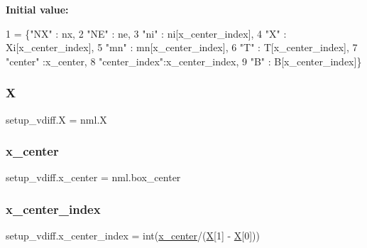 {\bfseries Initial value\+:}
\begin{DoxyCode}
1 =  \{\textcolor{stringliteral}{"NX"}       : nx,
2              \textcolor{stringliteral}{"NE"}       : ne,
3              \textcolor{stringliteral}{"ni"}       : ni[x\_center\_index],
4              \textcolor{stringliteral}{"X"}        : Xi[x\_center\_index],
5              \textcolor{stringliteral}{"mn"}       : mn[x\_center\_index],
6              \textcolor{stringliteral}{"T"}        : T[x\_center\_index],
7              \textcolor{stringliteral}{"center"}   :x\_center,
8              \textcolor{stringliteral}{"center\_index"}:x\_center\_index,
9              \textcolor{stringliteral}{"B"}        : B[x\_center\_index]\}
\end{DoxyCode}
\mbox{\label{namespacesetup__vdiff_a2d0381db5d912bb072d7cfa7c997de97}} 
\subsubsection{\texorpdfstring{X}{X}}
{\footnotesize\ttfamily setup\+\_\+vdiff.\+X = nml.\+X}

\mbox{\label{namespacesetup__vdiff_af577fed18e10308814044775943892ca}} 
\subsubsection{\texorpdfstring{x\+\_\+center}{x\_center}}
{\footnotesize\ttfamily setup\+\_\+vdiff.\+x\+\_\+center = nml.\+box\+\_\+center}

\mbox{\label{namespacesetup__vdiff_a76c3ba2eb6a6a9c7ed87d8a4de754771}} 
\subsubsection{\texorpdfstring{x\+\_\+center\+\_\+index}{x\_center\_index}}
{\footnotesize\ttfamily setup\+\_\+vdiff.\+x\+\_\+center\+\_\+index = int(\hyperlink{namespacesetup__vdiff_af577fed18e10308814044775943892ca}{x\+\_\+center}/(\hyperlink{namespacesetup__vdiff_a2d0381db5d912bb072d7cfa7c997de97}{X}\mbox{[}1\mbox{]} -\/ \hyperlink{namespacesetup__vdiff_a2d0381db5d912bb072d7cfa7c997de97}{X}\mbox{[}0\mbox{]}))}

